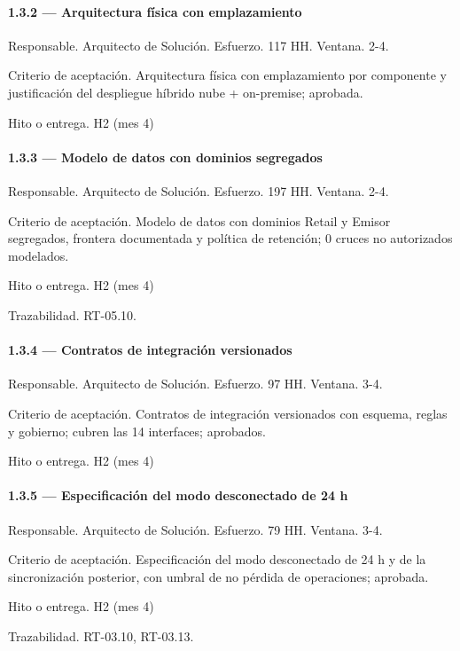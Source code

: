 \documentclass[11pt]{article}
\begin{document}
\paragraph{1.3.2 — Arquitectura física con emplazamiento}

Responsable. Arquitecto de Solución. Esfuerzo. 117 HH. Ventana. 2-4.

Criterio de aceptación. Arquitectura física con emplazamiento por componente y justificación del despliegue híbrido nube + on-premise; aprobada.

Hito o entrega. H2 (mes 4)

\paragraph{1.3.3 — Modelo de datos con dominios segregados}

Responsable. Arquitecto de Solución. Esfuerzo. 197 HH. Ventana. 2-4.

Criterio de aceptación. Modelo de datos con dominios Retail y Emisor segregados, frontera documentada y política de retención; 0 cruces no autorizados modelados.

Hito o entrega. H2 (mes 4)

Trazabilidad. RT-05.10.

\paragraph{1.3.4 — Contratos de integración versionados}

Responsable. Arquitecto de Solución. Esfuerzo. 97 HH. Ventana. 3-4.

Criterio de aceptación. Contratos de integración versionados con esquema, reglas y gobierno; cubren las 14 interfaces; aprobados.

Hito o entrega. H2 (mes 4)

\paragraph{1.3.5 — Especificación del modo desconectado de 24 h}

Responsable. Arquitecto de Solución. Esfuerzo. 79 HH. Ventana. 3-4.

Criterio de aceptación. Especificación del modo desconectado de 24 h y de la sincronización posterior, con umbral de no pérdida de operaciones; aprobada.

Hito o entrega. H2 (mes 4)

Trazabilidad. RT-03.10, RT-03.13.
\end{document}
